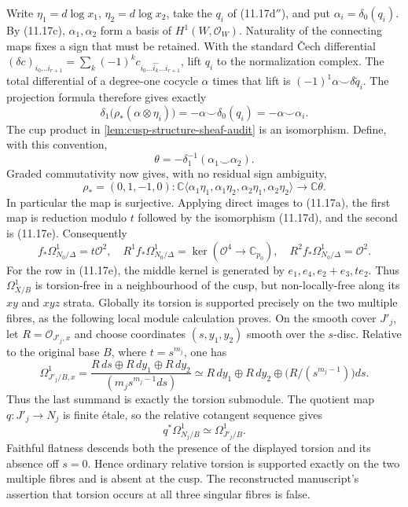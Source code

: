 \begin{remark}
Write $\eta_1=d\log x_1$, $\eta_2=d\log x_2$, take the $q_i$ of
(11.17d$''$), and put $\alpha_i=\delta_0(q_i)$.  By (11.17c),
$\alpha_1,\alpha_2$ form a basis of $H^1(W,\mathcal O_W)$.  Naturality of
the connecting maps fixes a sign that must be retained.  With the standard
\v Cech differential
$(\delta c)_{i_0\ldots i_{r+1}}
=\sum_k(-1)^kc_{i_0\ldots\widehat{i_k}\ldots i_{r+1}}$, lift $q_i$ to the
normalization complex.  The total differential of a degree-one cocycle
$\alpha$ times that lift is
$(-1)^1\alpha\smile\delta\widetilde q_i$.  The projection formula therefore
gives exactly
\[
 \delta_1\bigl(\rho_*(\alpha\otimes\eta_i)\bigr)
 =-\alpha\smile\delta_0(q_i)=-\alpha\smile\alpha_i.
\]
The cup product in \cref{lem:cusp-structure-sheaf-audit} is an isomorphism.
Define, with this convention,
\[
 \theta=-\delta_1^{-1}(\alpha_1\smile\alpha_2).
\]
Graded commutativity now gives, with no residual sign ambiguity,
\[
 \rho_*=(0,1,-1,0):
 \mathbb C\langle
 \alpha_1\eta_1,\alpha_1\eta_2,\alpha_2\eta_1,\alpha_2\eta_2
 \rangle\longrightarrow\mathbb C\theta.
\tag{11.17e}
\]
In particular the map is surjective.  Applying direct images to (11.17a),
the first map is reduction modulo $t$ followed by the isomorphism (11.17d),
and the second is (11.17e).  Consequently
\[
 f_*\Omega^1_{N_0/\Delta}=t\mathcal O^2,\quad
 R^1f_*\Omega^1_{N_0/\Delta}=\ker(\mathcal O^4\to\mathbb C_{p_0}),
 \quad R^2f_*\Omega^1_{N_0/\Delta}=\mathcal O^2.
\]
For the row in (11.17e), the middle kernel is generated by
$e_1,e_4,e_2+e_3,te_2$.
Thus $\Omega^1_{X/B}$ is torsion-free in a neighbourhood of the cusp, but
non-locally-free along its $xy$ and $xyz$ strata.  Globally its torsion is
supported precisely on the two multiple fibres, as the following local module
calculation proves.  On the smooth cover $J'_j$, let
$R=\mathcal O_{J'_j,x}$ and choose coordinates $(s,y_1,y_2)$ smooth over the
$s$-disc.  Relative to the original base $B$, where $t=s^{m_j}$, one has
\[
 \Omega^1_{J'_j/B,x}
 =\frac{R\,ds\oplus R\,dy_1\oplus R\,dy_2}
        {(m_js^{m_j-1}ds)}
 \simeq R\,dy_1\oplus R\,dy_2
 \oplus\bigl(R/(s^{m_j-1})\bigr)ds.
\tag{11.17f}
\]
Thus the last summand is exactly the torsion submodule.  The quotient map
$q:J'_j\to N_j$ is finite \'{e}tale, so the relative cotangent sequence gives
\[
 q^*\Omega^1_{N_j/B}\simeq\Omega^1_{J'_j/B}.
\]
Faithful flatness descends both the presence of the displayed torsion and its
absence off $s=0$.  Hence ordinary relative torsion is supported exactly on
the two multiple fibres and is absent at the cusp.  The reconstructed
manuscript's assertion that torsion occurs at all three singular fibres is
false.
\end{remark}

